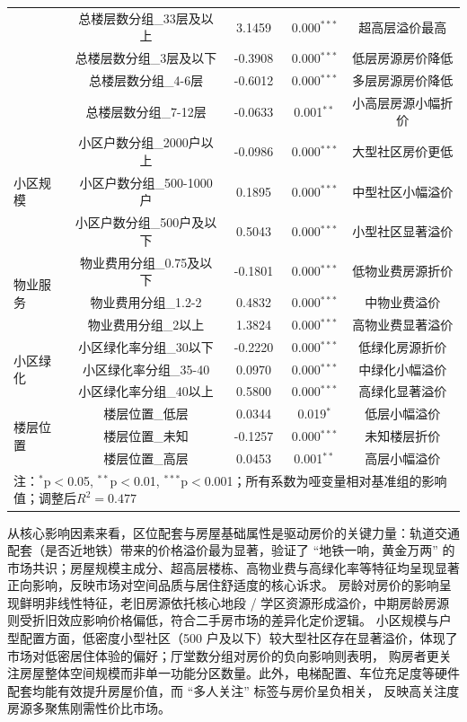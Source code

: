 \documentclass[UTF8]{ctexart}
\begin{document}
\begin{table}[htbp]
{\begin{tabular}{lcccc}
    & 总楼层数分组\_33层及以上 & 3.1459 & 0.000$^{***}$ & 超高层溢价最高 \\
    & 总楼层数分组\_3层及以下 & -0.3908 & 0.000$^{***}$ & 低层房源房价降低 \\
    & 总楼层数分组\_4-6层 & -0.6012 & 0.000$^{***}$ & 多层房源房价降低 \\
    & 总楼层数分组\_7-12层 & -0.0633 & 0.001$^{**}$ & 小高层房源小幅折价 \\
    \midrule
    \multirow{3}{*}{小区规模} & 小区户数分组\_2000户以上 & -0.0986 & 0.000$^{***}$ & 大型社区房价更低 \\
    & 小区户数分组\_500-1000户 & 0.1895 & 0.000$^{***}$ & 中型社区小幅溢价 \\
    & 小区户数分组\_500户及以下 & 0.5043 & 0.000$^{***}$ & 小型社区显著溢价 \\
    \midrule
    \multirow{3}{*}{物业服务} & 物业费用分组\_0.75及以下 & -0.1801 & 0.000$^{***}$ & 低物业费房源折价 \\
    & 物业费用分组\_1.2-2 & 0.4832 & 0.000$^{***}$ & 中物业费溢价 \\
    & 物业费用分组\_2以上 & 1.3824 & 0.000$^{***}$ & 高物业费显著溢价 \\
    \midrule
    \multirow{3}{*}{小区绿化} & 小区绿化率分组\_30以下 & -0.2220 & 0.000$^{***}$ & 低绿化房源折价 \\
    & 小区绿化率分组\_35-40 & 0.0970 & 0.000$^{***}$ & 中绿化小幅溢价 \\
    & 小区绿化率分组\_40以上 & 0.5800 & 0.000$^{***}$ & 高绿化显著溢价 \\
    \midrule
    \multirow{3}{*}{楼层位置} & 楼层位置\_低层 & 0.0344 & 0.019$^{*}$ & 低层小幅溢价 \\
    & 楼层位置\_未知 & -0.1257 & 0.000$^{***}$ & 未知楼层折价 \\
    & 楼层位置\_高层 & 0.0453 & 0.001$^{**}$ & 高层小幅溢价 \\
    \bottomrule
    \multicolumn{5}{l}{\footnotesize{注：$^{*}$p$<$0.05, $^{**}$p$<$0.01, $^{***}$p$<$0.001；所有系数为哑变量相对基准组的影响值；调整后$R^2=0.477$}} \\
  \end{tabular}%
  }
\end{table}

从核心影响因素来看，区位配套与房屋基础属性是驱动房价的关键力量：轨道交通配套（是否近地铁）带来的价格溢价最为显著，验证了 “地铁一响，黄金万两” 
的市场共识；房屋规模主成分、超高层楼栋、高物业费与高绿化率等特征均呈现显著正向影响，反映市场对空间品质与居住舒适度的核心诉求。
房龄对房价的影响呈现鲜明非线性特征，老旧房源依托核心地段 / 学区资源形成溢价，中期房龄房源则受折旧效应影响价格偏低，符合二手房市场的差异化定价逻辑。
小区规模与户型配置方面，低密度小型社区（500 户及以下）较大型社区存在显著溢价，体现了市场对低密居住体验的偏好；厅堂数分组对房价的负向影响则表明，
购房者更关注房屋整体空间规模而非单一功能分区数量。此外，电梯配置、车位充足度等硬件配套均能有效提升房屋价值，而 “多人关注” 标签与房价呈负相关，
反映高关注度房源多聚焦刚需性价比市场。
\end{document}

